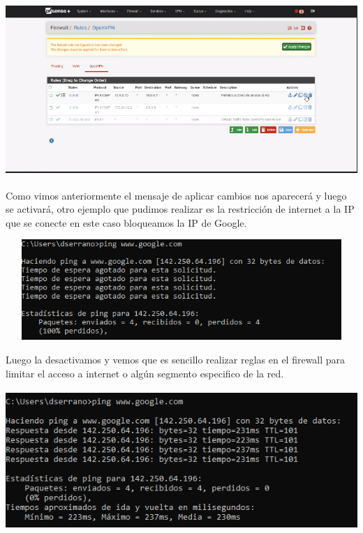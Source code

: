 \documentclass[
]{article}
\begin{document}
\includegraphics[width=5.98958in,height=2.58333in]{media/image13.png}

Como vimos anteriormente el mensaje de aplicar cambios nos aparecerá y
luego se activará, otro ejemplo que pudimos realizar es la restricción
de internet a la IP que se conecte en este caso bloqueamos la IP de
Google.

\includegraphics[width=6.13542in,height=1.5in]{media/image14.png}

Luego la desactivamos y vemos que es sencillo realizar reglas en el
firewall para limitar el acceso a internet o algún segmento especifico
de la red.

\includegraphics[width=6.11458in,height=2.09375in]{media/image15.png}
\end{document}
